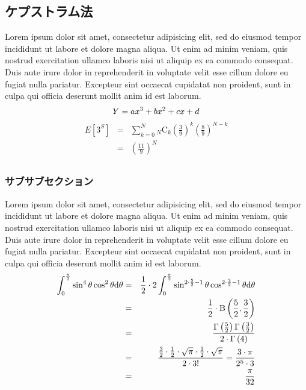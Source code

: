 \documentclass[a4j,12pt]{jarticle}
\begin{document}
\subsection{ケプストラム法}
Lorem ipsum dolor sit amet, consectetur adipisicing elit, sed do eiusmod tempor incididunt ut labore et dolore magna aliqua. Ut enim ad minim veniam, quis nostrud exercitation ullamco laboris nisi ut aliquip ex ea commodo consequat. Duis aute irure dolor in reprehenderit in voluptate velit esse cillum dolore eu fugiat nulla pariatur. Excepteur sint occaecat cupidatat non proident, sunt in culpa qui officia deserunt mollit anim id est laborum.
\begin{equation}
Y=ax^3+bx^2+cx+d \\
\end{equation}
\begin{eqnarray}
E[3^S] & = & \sum ^{N} _{k=0}{} _{N}\mathrm{C}_{k} \left( \frac{3}{9} \right)^{k} \left( \frac{8}{9} \right)^{N-k} \\
       & = & \left( \frac{11}{9}\right)^N \\
\end{eqnarray}
\subsubsection{サブサブセクション}
Lorem ipsum dolor sit amet, consectetur adipisicing elit, sed do eiusmod tempor incididunt ut labore et dolore magna aliqua. Ut enim ad minim veniam, quis nostrud exercitation ullamco laboris nisi ut aliquip ex ea commodo consequat. Duis aute irure dolor in reprehenderit in voluptate velit esse cillum dolore eu fugiat nulla pariatur. Excepteur sint occaecat cupidatat non proident, sunt in culpa qui officia deserunt mollit anim id est laborum.
\begin{eqnarray}
\int^\frac{\pi}{2} _0 \sin^4\theta \cos^2 \theta {\rm d} \theta &=& \frac{1}{2} \cdot 2 \int^\frac{\pi}{2} _0 \sin^{2 \cdot \frac{5}{2} -1}\theta \cos^{2 \cdot \frac{3}{2}-1} \theta {\rm d}\theta\\
&=& \frac{1}{2} \cdot \rm B \left( \frac{5}{2} , \frac{3}{2} \right)\nonumber \\
&=& \frac{\Gamma \left(\frac{5}{2} \right)\Gamma \left(\frac{3}{2} \right)}{2\cdot\Gamma \left( 4 \right)}\\
&=& \frac{\frac{3}{2} \cdot \frac{1}{2} \cdot \sqrt{\pi} \cdot \frac{1}{2} \cdot \sqrt{\pi}}{2 \cdot 3! }  =  \frac{3 \cdot \pi}{2^5 \cdot 3}\nonumber \\
&=& \frac{\pi}{32}
\end{eqnarray}
\end{document}
